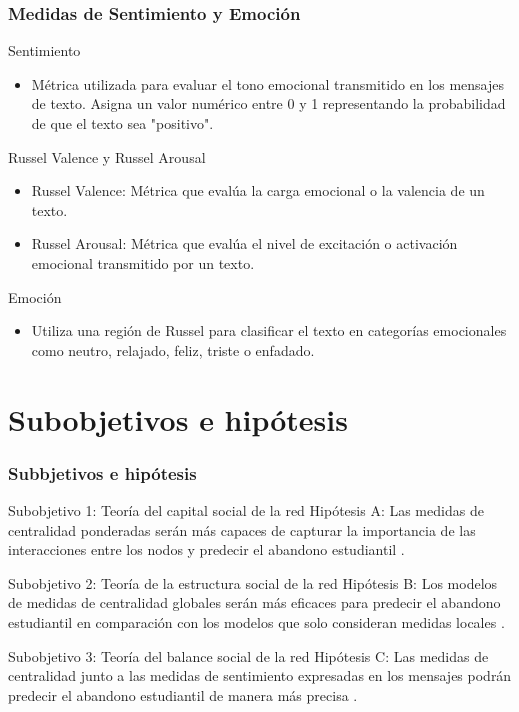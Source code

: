 \documentclass{beamer}
\begin{document}
\begin{frame}
	\frametitle{Medidas de Sentimiento y Emoción}
	\begin{block}{Sentimiento}
		\begin{itemize}
			\item Métrica utilizada para evaluar el tono emocional transmitido en los mensajes de texto. Asigna un valor numérico entre 0 y 1 representando la probabilidad de que el texto sea "positivo".
		\end{itemize}
	\end{block}
	
	\begin{block}{Russel Valence y Russel Arousal}
		\begin{itemize}
			\item Russel Valence: Métrica que evalúa la carga emocional o la valencia de un texto.
			\item Russel Arousal: Métrica que evalúa el nivel de excitación o activación emocional transmitido por un texto.
		\end{itemize}
	\end{block}
	
	\begin{block}{Emoción}
		\begin{itemize}
			\item Utiliza una región de Russel para clasificar el texto en categorías emocionales como neutro, relajado, feliz, triste o enfadado.
		\end{itemize}
	\end{block}
	
\end{frame}


\section{Subobjetivos e hipótesis}
\begin{frame}
	\frametitle{Subbjetivos e hipótesis}
	\begin{block}{Subobjetivo 1: Teoría del capital social de la red}
		Hipótesis A: Las medidas de centralidad ponderadas serán más capaces de capturar la importancia de las interacciones entre los nodos y predecir el abandono estudiantil \citep{wasko_why_2005}.
		
	\end{block}
	\begin{block}{Subobjetivo 2: Teoría de la estructura social de la red}
		Hipótesis B: Los modelos de medidas de centralidad globales serán más eficaces para predecir el abandono estudiantil en comparación con los modelos que solo consideran medidas locales \citep{krause_social_2007}.
		
	\end{block}
	\begin{block}{Subobjetivo 3: Teoría del balance social de la red}
		Hipótesis C: Las medidas de centralidad junto a las medidas de sentimiento expresadas en los mensajes podrán predecir el abandono estudiantil de manera más precisa \citep{kim2012a}.
	\end{block}
\end{frame}
\end{document}
